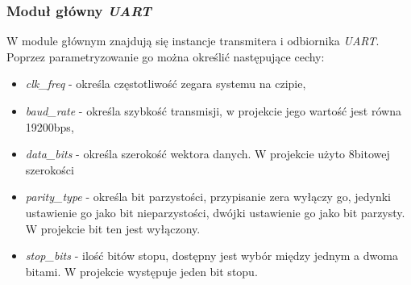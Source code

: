 \documentclass[11pt,a4paper]{article}
\begin{document}
	\subsubsection{Moduł główny \textit{UART}}
	W module głównym znajdują się instancje transmitera i odbiornika \textit{UART}.  Poprzez parametryzowanie go można określić następujące cechy:
	\begin{itemize}
		\item \textit{clk\_freq} - określa częstotliwość zegara systemu na czipie,
		\item \textit{baud\_rate} - określa szybkość transmisji, w projekcie jego wartość jest równa 19200bps,
		\item \textit{data\_bits} - określa szerokość wektora danych. W projekcie użyto 8bitowej szerokości
		\item \textit{parity\_type} - określa bit parzystości, przypisanie zera wyłączy go, jedynki ustawienie go jako bit nieparzystości, dwójki ustawienie go jako bit parzysty. W projekcie bit ten jest wyłączony.
		\item \textit{stop\_bits} - ilość bitów stopu, dostępny jest wybór między jednym a dwoma bitami. W projekcie występuje jeden bit stopu.
	\end{itemize}
\end{document}
